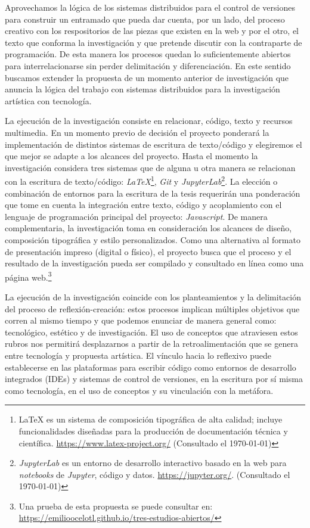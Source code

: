 Aprovechamos la lógica de los sistemas distribuidos para el control de versiones para construir un entramado que pueda dar cuenta, por un lado, del proceso creativo con los respositorios de las piezas que existen en la web y por el otro, el texto que conforma la investigación y que pretende discutir con la contraparte de programación. De esta manera los procesos quedan lo suficientemente abiertos para interrelacionarse sin perder delimitación y diferenciación. En este sentido buscamos extender la propuesta de un momento anterior de investigación que anuncia la lógica del trabajo con sistemas distribuidos para la investigación artística con tecnología.

La ejecución de la investigación consiste en relacionar, código, texto y recursos multimedia. En un momento previo de decisión el proyecto ponderará la implementación de distintos sistemas de escritura de texto/código y elegiremos el que mejor se adapte a los alcances del proyecto. Hasta el momento la investigación considera tres sistemas que de alguna u otra manera se relacionan con la escritura de texto/código: \textit{LaTeX}\footnote{LaTeX es un sistema de composición tipográfica de alta calidad; incluye funcionalidades diseñadas para la producción de documentación técnica y científica. \url{https://www.latex-project.org/} (Consultado el \today)}, \textit{Git} y \textit{JupyterLab}\footnote{\textit{JupyterLab} es un entorno de desarrollo interactivo basado en la web para \textit{notebooks} de \textit{Jupyter}, código y datos. \url{https://jupyter.org/}. (Consultado el \today)}. La elección o combinación de entornos para la escritura de la tesis requerirán una ponderación que tome en cuenta la integración entre texto, código y acoplamiento con el lenguaje de programación principal del proyecto: \textit{Javascript}. De manera complementaria, la investigación toma en consideración los alcances de diseño, composición tipográfica y estilo personalizados. Como una alternativa al formato de presentación impreso (digital o físico), el proyecto busca que el proceso y el resultado de la investigación pueda ser compilado y consultado en línea como una página web.\footnote{Una prueba de esta propuesta se puede consultar en: \url{https://emilioocelotl.github.io/tres-estudios-abiertos/}}

La ejecución de la investigación coincide con los planteamientos y la delimitación del proceso de reflexión-creación: estos procesos implican múltiples objetivos que corren al mismo tiempo y que podemos enunciar de manera general como: tecnológico, estético y de investigación. El uso de conceptos que atraviesen estos rubros nos permitirá desplazarnos a partir de la retroalimentación que se genera entre tecnología y propuesta artística. El vínculo hacia lo reflexivo puede establecerse en las plataformas para escribir código como entornos de desarrollo integrados (IDEs) y sistemas de control de versiones, en la escritura por sí misma como tecnología, en el uso de conceptos y su vinculación con la metáfora. 

